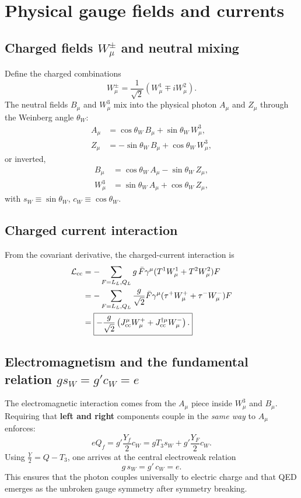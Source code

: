 \section{Physical gauge fields and currents}
\subsection{Charged fields $W^\pm_\mu$ and neutral mixing}
Define the charged combinations
\begin{equation}
\boxed{
W^\pm_\mu=\frac{1}{\sqrt{2}}\left(W^1_\mu\mp iW^2_\mu\right).
}
\label{eq:Wpm}
\end{equation}
The neutral fields $B_\mu$ and $W^3_\mu$ mix into the physical photon $A_\mu$ and $Z_\mu$ through the Weinberg angle $\theta_W$:
\begin{align}
A_\mu &= \cos\theta_W\,B_\mu+\sin\theta_W\,W^3_\mu,\\
Z_\mu &= -\sin\theta_W\,B_\mu+\cos\theta_W\,W^3_\mu,
\end{align}
or inverted,
\begin{align}
B_\mu &= \cos\theta_W\,A_\mu-\sin\theta_W\,Z_\mu,\\
W^3_\mu &= \sin\theta_W\,A_\mu+\cos\theta_W\,Z_\mu,
\end{align}
with $s_W\equiv\sin\theta_W$, $c_W\equiv\cos\theta_W$.

\subsection{Charged current interaction}
From the covariant derivative, the charged-current interaction is
\begin{align}
\mathcal L_{\rm cc}
&= -\sum_{F=L_L,Q_L} g\,\bar F\gamma^\mu(T^1W^1_\mu+T^2W^2_\mu)F\\
&= -\sum_{F=L_L,Q_L}\frac{g}{\sqrt{2}}\bar F\gamma^\mu(\tau^+W^+_\mu+\tau^-W^-_\mu)F\\
&=
\boxed{
-\frac{g}{\sqrt{2}}\left(J^\mu_{\rm cc}W^+_\mu+J_{\rm cc}^{\dagger\mu}W^-_\mu\right).
}
\label{eq:Lcc}
\end{align}

\subsection{Electromagnetism and the fundamental relation $gs_W=g'c_W=e$}
The electromagnetic interaction comes from the $A_\mu$ piece inside $W^3_\mu$ and $B_\mu$.
Requiring that \textbf{left and right} components couple in the \emph{same way} to $A_\mu$ enforces:
\begin{equation}
eQ_f = g'\frac{Y_f}{2}c_W = gT_3 s_W + g'\frac{Y_F}{2}c_W.
\end{equation}
Using $\frac{Y}{2}=Q-T_3$, one arrives at the central electroweak relation
\begin{equation}
\boxed{
g\,s_W=g'\,c_W=e.
}
\label{eq:gsW-e}
\end{equation}
This ensures that the photon couples universally to electric charge and that QED emerges as the unbroken gauge symmetry after symmetry breaking.

